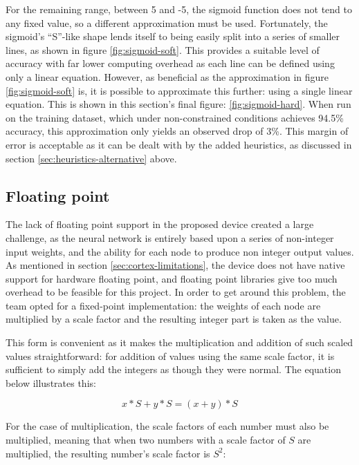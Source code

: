For the remaining range, between 5 and -5, the sigmoid function does not tend to any fixed value, so a different approximation must be used. Fortunately, the sigmoid's ``S''-like shape lends itself to being easily split into a series of smaller lines, as shown in figure \ref{fig:sigmoid-soft}. This provides a suitable level of accuracy with far lower computing overhead as each line can be defined using only a linear equation. However, as beneficial as the approximation in figure \ref{fig:sigmoid-soft} is, it is possible to approximate this further: using a single linear equation. This is shown in this section's final figure: \ref{fig:sigmoid-hard}. When run on the training dataset, which under non-constrained conditions achieves 94.5\% accuracy, this approximation only yields an observed drop of 3\%. This margin of error is acceptable as it can be dealt with by the added heuristics, as discussed in section \ref{sec:heuristics-alternative} above.

\subsection{Floating point \label{sec:floating-point}}
The lack of floating point support in the proposed device created a large challenge, as the neural network is entirely based upon a series of non-integer input weights, and the ability for each node to produce non integer output values. As mentioned in section \ref{sec:cortex-limitations}, the device does not have native support for hardware floating point, and floating point libraries give too much overhead to be feasible for this project. In order to get around this problem, the team opted for a fixed-point implementation: the weights of each node are multiplied by a scale factor and the resulting integer part is taken as the value.

This form is convenient as it makes the multiplication and addition of such scaled values straightforward: for addition of values using the same scale factor, it is sufficient to simply add the integers as though they were normal. The equation below illustrates this:

\begin{equation}
\label{eq:bits:addition}
x*S+y*S=(x+y)*S
\end{equation}

For the case of multiplication, the scale factors of each number must also be multiplied, meaning that when two numbers with a scale factor of $S$ are multiplied, the resulting number's scale factor is $S^2$:

